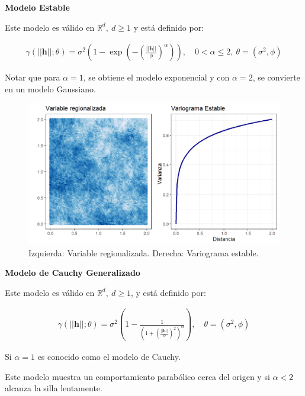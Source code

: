 \documentclass[
]{book}
\begin{document}
\textbf{Modelo Estable}

Este modelo es válido en \(\mathbb{R}^d,\ d\geq1\) y está definido por:

\begin{align}
    \gamma(||\textbf{h}||;\theta)=\sigma^2 \left(1-\exp\left(-\left(\frac{||\textbf{h}||}{\phi}\right)^\alpha\right) \right),\quad 0<\alpha \leq 2,\ \theta=(\sigma^2,\phi)
\end{align}

Notar que para \(\alpha=1\), se obtiene el modelo exponencial y con \(\alpha=2\), se convierte en un modelo Gaussiano.

\begin{figure}
\includegraphics[width=17.78in]{figuras/otros/estable_var} \caption{Izquierda: Variable regionalizada. Derecha: Variograma estable.}\label{fig:establevar}
\end{figure}

\textbf{Modelo de Cauchy Generalizado}

Este modelo es válido en \(\mathbb{R}^d,\ d\geq1\), y está definido por:

\begin{align}
    \gamma(||\textbf{h}||;\theta)=\sigma^2\left(1-\frac{1}{\left(1+\left( \frac{||\textbf{h}||}{\phi} \right)^2\right)^\alpha} \right), \quad \theta=(\sigma^2,\phi)
\end{align}

Si \(\alpha=1\) es conocido como el modelo de Cauchy.

Este modelo muestra un comportamiento parabólico cerca del origen y si \(\alpha<2\) alcanza la silla lentamente.
\end{document}
